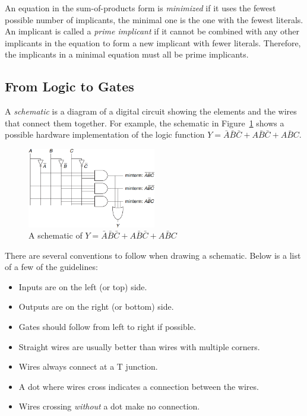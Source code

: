 \documentclass[12pt]{article}
\begin{document}
\begin{enumerate}
  An equation in the sum-of-products form is \textit{minimized} if it uses the fewest possible number of implicants, the minimal one is the one with the fewest literals. An implicant is called a \textit{prime implicant} if it cannot be combined with any other implicants in the equation to form a new implicant with fewer literals. Therefore, the implicants in a minimal equation must all be prime implicants.
\end{enumerate}

\subsection{From Logic to Gates}

A \textit{schematic} is a diagram of a digital circuit showing the elements and the wires that connect them together. For example, the schematic in Figure~\ref{figure:2} shows a possible hardware implementation of the logic function $Y = \bar{A}\bar{B}\bar{C} + A\bar{B}\bar{C} + A\bar{B}C$.

\begin{figure}[ht]
  \centering
  \includegraphics[width=0.5\textwidth]{schematic.png}
  \caption{A schematic of $Y = \bar{A}\bar{B}\bar{C} + A\bar{B}\bar{C} + A\bar{B}C$}
  \label{figure:2}
\end{figure}

There are several conventions to follow when drawing a schematic. Below is a list of a few of the guidelines:

\begin{itemize}
  \item Inputs are on the left (or top) side.
  \item Outputs are on the right (or bottom) side.
  \item Gates should follow from left to right if possible.
  \item Straight wires are usually better than wires with multiple corners.
  \item Wires always connect at a T junction.
  \item A dot where wires cross indicates a connection between the wires.
  \item Wires crossing \textit{without} a dot make no connection.
\end{itemize}
\end{document}
